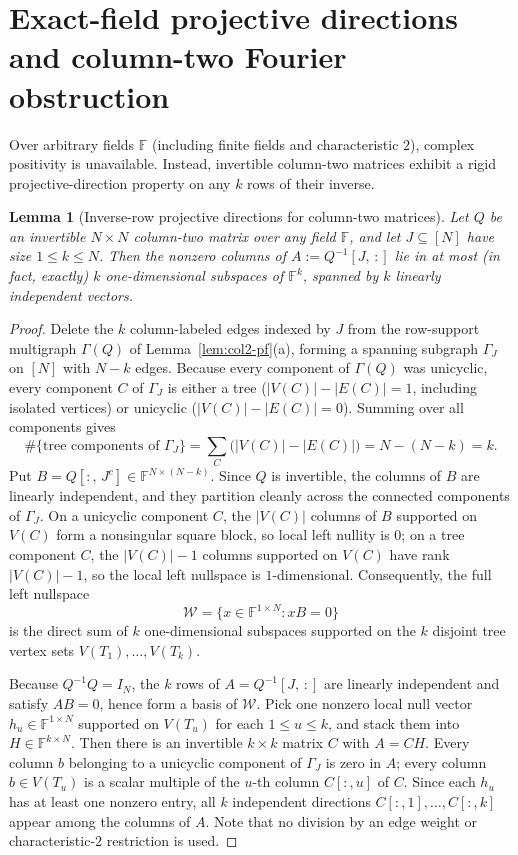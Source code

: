 \documentclass[11pt,reqno]{amsart}
\numberwithin{equation}{section}
\newtheorem{lemma}[theorem]{Lemma}
\theoremstyle{definition}
\theoremstyle{remark}
\newcommand{\F}{\mathbb{F}}
\begin{document}
\section{Exact-field projective directions and column-two Fourier obstruction}
\label{sec:field}

Over arbitrary fields $\F$ (including finite fields and characteristic $2$), complex positivity is unavailable. Instead, invertible column-two matrices exhibit a rigid projective-direction property on any $k$ rows of their inverse.

\begin{lemma}[Inverse-row projective directions for column-two matrices]
\label{lem:proj-dir}
Let $Q$ be an invertible $N\times N$ column-two matrix over \emph{any} field $\F$, and let $J\subseteq[N]$ have size $1\le k\le N$. Then the nonzero columns of $A := Q^{-1}[J,\,{:}]$ lie in at most (in fact, exactly) $k$ one-dimensional subspaces of $\F^k$, spanned by $k$ linearly independent vectors.
\end{lemma}

\begin{proof}
Delete the $k$ column-labeled edges indexed by $J$ from the row-support multigraph $\Gamma(Q)$ of Lemma~\ref{lem:col2-pf}(a), forming a spanning subgraph $\Gamma_J$ on $[N]$ with $N-k$ edges. Because every component of $\Gamma(Q)$ was unicyclic, every component $C$ of $\Gamma_J$ is either a tree ($|V(C)| - |E(C)| = 1$, including isolated vertices) or unicyclic ($|V(C)| - |E(C)| = 0$). Summing over all components gives
\[
\#\{\text{tree components of }\Gamma_J\} = \sum_C\bigl(|V(C)| - |E(C)|\bigr) = N - (N - k) = k.
\]
Put $B = Q[{:},\, J^c]\in\F^{N\times(N-k)}$. Since $Q$ is invertible, the columns of $B$ are linearly independent, and they partition cleanly across the connected components of $\Gamma_J$. On a unicyclic component $C$, the $|V(C)|$ columns of $B$ supported on $V(C)$ form a nonsingular square block, so local left nullity is $0$; on a tree component $C$, the $|V(C)| - 1$ columns supported on $V(C)$ have rank $|V(C)| - 1$, so the local left nullspace is $1$-dimensional. Consequently, the full left nullspace
\[
\mathcal{W} = \{x\in\F^{1\times N} : xB = 0\}
\]
is the direct sum of $k$ one-dimensional subspaces supported on the $k$ disjoint tree vertex sets $V(T_1),\ldots,V(T_k)$.

Because $Q^{-1}Q = I_N$, the $k$ rows of $A = Q^{-1}[J,\,{:}]$ are linearly independent and satisfy $AB = 0$, hence form a basis of $\mathcal{W}$. Pick one nonzero local null vector $h_u\in\F^{1\times N}$ supported on $V(T_u)$ for each $1\le u\le k$, and stack them into $H\in\F^{k\times N}$. Then there is an invertible $k\times k$ matrix $C$ with $A = CH$. Every column $b$ belonging to a unicyclic component of $\Gamma_J$ is zero in $A$; every column $b\in V(T_u)$ is a scalar multiple of the $u$-th column $C[{:},u]$ of $C$. Since each $h_u$ has at least one nonzero entry, all $k$ independent directions $C[{:},1],\ldots,C[{:},k]$ appear among the columns of $A$. Note that no division by an edge weight or characteristic-$2$ restriction is used.
\end{proof}
\end{document}
